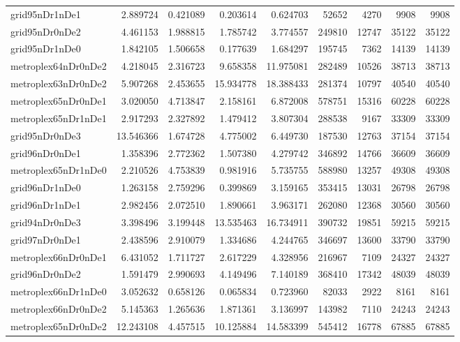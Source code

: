 \begin{longtable}{|l|r|r|r|r|r|r|r|r|}
grid95nDr1nDe1 & 2.889724 & 0.421089 & 0.203614 & 0.624703 & 52652 & 4270 & 9908 & 9908 \\
grid95nDr0nDe2 & 4.461153 & 1.988815 & 1.785742 & 3.774557 & 249810 & 12747 & 35122 & 35122 \\
grid95nDr1nDe0 & 1.842105 & 1.506658 & 0.177639 & 1.684297 & 195745 & 7362 & 14139 & 14139 \\
metroplex64nDr0nDe2 & 4.218045 & 2.316723 & 9.658358 & 11.975081 & 282489 & 10526 & 38713 & 38713 \\
metroplex63nDr0nDe2 & 5.907268 & 2.453655 & 15.934778 & 18.388433 & 281374 & 10797 & 40540 & 40540 \\
metroplex65nDr0nDe1 & 3.020050 & 4.713847 & 2.158161 & 6.872008 & 578751 & 15316 & 60228 & 60228 \\
metroplex65nDr1nDe1 & 2.917293 & 2.327892 & 1.479412 & 3.807304 & 288538 & 9167 & 33309 & 33309 \\
grid95nDr0nDe3 & 13.546366 & 1.674728 & 4.775002 & 6.449730 & 187530 & 12763 & 37154 & 37154 \\
grid96nDr0nDe1 & 1.358396 & 2.772362 & 1.507380 & 4.279742 & 346892 & 14766 & 36609 & 36609 \\
metroplex65nDr1nDe0 & 2.210526 & 4.753839 & 0.981916 & 5.735755 & 588980 & 13257 & 49308 & 49308 \\
grid96nDr1nDe0 & 1.263158 & 2.759296 & 0.399869 & 3.159165 & 353415 & 13031 & 26798 & 26798 \\
grid96nDr1nDe1 & 2.982456 & 2.072510 & 1.890661 & 3.963171 & 262080 & 12368 & 30560 & 30560 \\
grid94nDr0nDe3 & 3.398496 & 3.199448 & 13.535463 & 16.734911 & 390732 & 19851 & 59215 & 59215 \\
grid97nDr0nDe1 & 2.438596 & 2.910079 & 1.334686 & 4.244765 & 346697 & 13600 & 33790 & 33790 \\
metroplex66nDr0nDe1 & 6.431052 & 1.711727 & 2.617229 & 4.328956 & 216967 & 7109 & 24327 & 24327 \\
grid96nDr0nDe2 & 1.591479 & 2.990693 & 4.149496 & 7.140189 & 368410 & 17342 & 48039 & 48039 \\
metroplex66nDr1nDe0 & 3.052632 & 0.658126 & 0.065834 & 0.723960 & 82033 & 2922 & 8161 & 8161 \\
metroplex66nDr0nDe2 & 5.145363 & 1.265636 & 1.871361 & 3.136997 & 143982 & 7110 & 24243 & 24243 \\
metroplex65nDr0nDe2 & 12.243108 & 4.457515 & 10.125884 & 14.583399 & 545412 & 16778 & 67885 & 67885 \\

\end{longtable}
